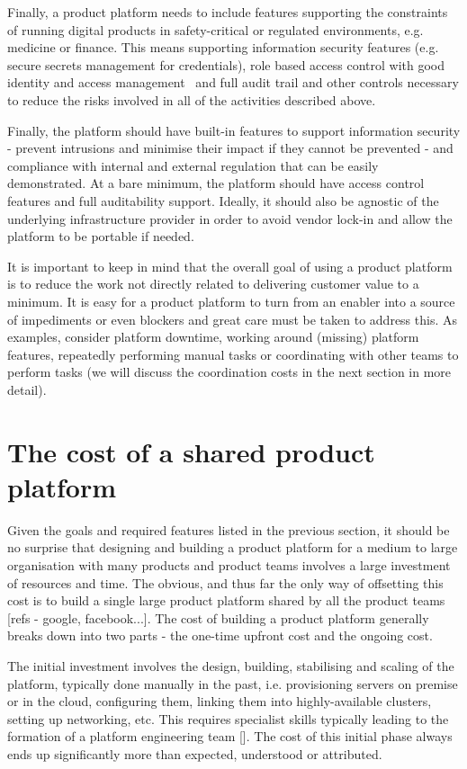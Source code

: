 \documentclass[reprint,amsmath,amssymb,aps]{revtex4-1}
\begin{document}
Finally, a product platform needs to include features supporting the constraints of running digital products in safety-critical or regulated environments, e.g. medicine or finance. This means supporting information security features (e.g. secure secrets management for credentials), role based access control with good identity and access management~\cite{RoleBase56:online} and full audit trail and other controls necessary to reduce the risks involved in all of the activities described above.

Finally, the platform should have built-in features to support information security - prevent intrusions and minimise their impact if they cannot be prevented - and compliance with internal and external regulation that can be easily demonstrated. At a bare minimum, the platform should have access control features and full auditability support. Ideally, it should also be agnostic of the underlying infrastructure provider in order to avoid vendor lock-in and allow the platform to be portable if needed.

It is important to keep in mind that the overall goal of using a product platform is to reduce the work not directly related to delivering customer value to a minimum. It is easy for a product platform to turn from an enabler into a source of impediments or even blockers and great care must be taken to address this. As examples, consider platform downtime, working around (missing) platform features, repeatedly performing manual tasks or coordinating with other teams to perform tasks (we will discuss the coordination costs in the next section in more detail).

\section{The cost of a shared product platform}
\label{sec:cost}

Given the goals and required features listed in the previous section, it should be no surprise that designing and building a product platform for a medium to large organisation with many products and product teams involves a large investment of resources and time. The obvious, and thus far the only way of offsetting this cost is to build a single large product platform shared by all the product teams [refs - google, facebook...]. The cost of building a product platform generally breaks down into two parts - the one-time upfront cost and the ongoing cost.

The initial investment involves the design, building, stabilising and scaling of the platform, typically done manually in the past, i.e. provisioning servers on premise or in the cloud, configuring them, linking them into highly-available clusters, setting up networking, etc. This requires specialist skills typically leading to the formation of a platform engineering team []. The cost of this initial phase always ends up significantly more than expected, understood or attributed.
\end{document}
